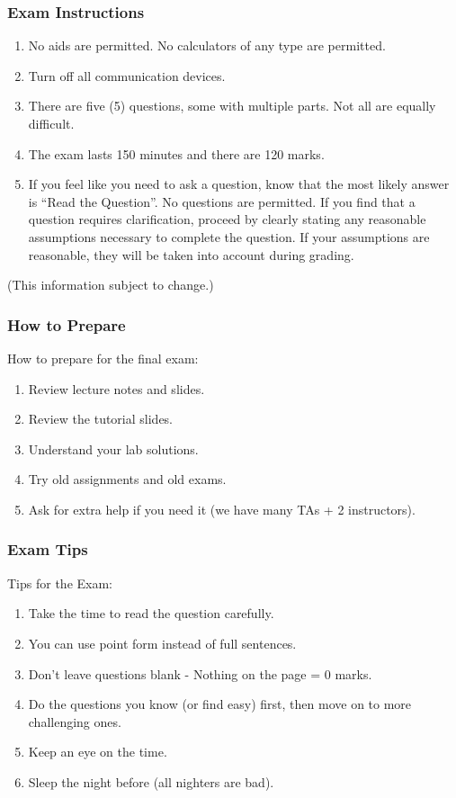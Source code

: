 \begin{frame}
\frametitle{Exam Instructions}

\begin{enumerate}
	\item No aids are permitted. No calculators of any type are permitted.
	\item Turn off all communication devices.
	\item There are five (5) questions, some with multiple parts. Not all are equally difficult.
	\item The exam lasts 150 minutes and there are 120 marks.
	\item If you feel like you need to ask a question, know that the most likely answer is ``Read the Question''. No questions are permitted. If you find that a question requires clarification, proceed by clearly stating any reasonable assumptions necessary to complete the question. If your assumptions are reasonable, they will be taken into account during grading.  
\end{enumerate}

(This information subject to change.)

\end{frame}



\begin{frame}
\frametitle{How to Prepare}

How to prepare for the final exam:

\begin{enumerate}
	\item Review lecture notes and slides.
	\item Review the tutorial slides.
	\item Understand your lab solutions.
	\item Try old assignments and old exams.
	\item Ask for extra help if you need it (we have many TAs + 2 instructors).
\end{enumerate}

\end{frame}

\begin{frame}
\frametitle{Exam Tips}

Tips for the Exam:

\begin{enumerate}
	\item Take the time to read the question carefully.
	\item You can use point form instead of full sentences.
	\item Don't leave questions blank - Nothing on the page = 0 marks.
	\item Do the questions you know (or find easy) first, then move on to more challenging ones.
	\item Keep an eye on the time.
	\item Sleep the night before (all nighters are bad).
	
\end{enumerate}

\end{frame}



